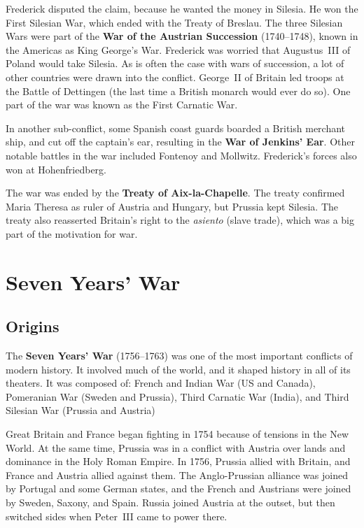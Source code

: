 Frederick disputed the claim, because he wanted the money in Silesia.
He won the First Silesian War, which ended with the Treaty of Breslau.
The three Silesian Wars were part of the \textbf{War of the Austrian Succession} (1740--1748),
known in the Americas as King George's War.
Frederick was worried that Augustus~III of Poland would take Silesia.
As is often the case with wars of succession,
a lot of other countries were drawn into the conflict.
George~II of Britain led troops at the Battle of Dettingen
(the last time a British monarch would ever do so).
One part of the war was known as the First Carnatic War.

In another sub-conflict, some Spanish coast guards boarded a British merchant ship,
and cut off the captain's ear, resulting in the \textbf{War of Jenkins' Ear}.
Other notable battles in the war included Fontenoy and Mollwitz.
Frederick's forces also won at Hohenfriedberg.

The war was ended by the \textbf{Treaty of Aix-la-Chapelle}.
The treaty confirmed Maria Theresa as ruler of Austria and Hungary, but Prussia kept Silesia.
The treaty also reasserted Britain's right to the \textit{asiento} (slave trade),
which was a big part of the motivation for war.

\section{Seven Years' War}

\subsection*{Origins}

The \textbf{Seven Years' War} (1756--1763) was one of the most important conflicts of modern history.
It involved much of the world, and it shaped history in all of its theaters.
It was composed of:
French and Indian War (US and Canada),
Pomeranian War (Sweden and Prussia),
Third Carnatic War (India),
and Third Silesian War (Prussia and Austria)

Great Britain and France began fighting in 1754 because of tensions in the New World.
At the same time, Prussia was in a conflict with Austria over lands and dominance in the Holy Roman Empire.
In 1756, Prussia allied with Britain, and France and Austria allied against them.
The Anglo-Prussian alliance was joined by Portugal and some German states,
and the French and Austrians were joined by Sweden, Saxony, and Spain.
Russia joined Austria at the outset, but then switched sides when Peter~III came to power there.

